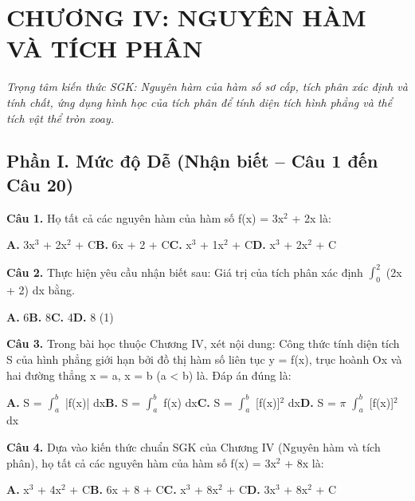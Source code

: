 \documentclass[11pt,a4paper]{article}
\begin{document}
\section*{\color{primary} CHƯƠNG IV: NGUYÊN HÀM VÀ TÍCH PHÂN}
\textit{Trọng tâm kiến thức SGK: Nguyên hàm của hàm số sơ cấp, tích phân xác định và tính chất, ứng dụng hình học của tích phân để tính diện tích hình phẳng và thể tích vật thể tròn xoay.}\par\vspace{4pt}
\subsection*{\color{accent} Phần I. Mức độ Dễ (Nhận biết -- Câu 1 đến Câu 20)}
\textbf{\color{primary} Câu 1.} Họ tất cả các nguyên hàm của hàm số f(x) = 3x$^2$ + 2x là:\par
\hspace*{1.5em}\textbf{A.} 3x$^3$ + 2x$^2$ + C\quad\quad \textbf{B.} 6x + 2 + C\quad\quad \textbf{C.} x$^3$ + 1x$^2$ + C\quad\quad \textbf{D.} x$^3$ + 2x$^2$ + C\par\vspace{2pt}
\textbf{\color{primary} Câu 2.} Thực hiện yêu cầu nhận biết sau: Giá trị của tích phân xác định $\int_{0}^{2}$ (2x + 2) dx bằng.\par
\hspace*{1.5em}\textbf{A.} 6\quad\quad \textbf{B.} 8\quad\quad \textbf{C.} 4\quad\quad \textbf{D.} 8 (1)\par\vspace{2pt}
\textbf{\color{primary} Câu 3.} Trong bài học thuộc Chương IV, xét nội dung: Công thức tính diện tích S của hình phẳng giới hạn bởi đồ thị hàm số liên tục y = f(x), trục hoành Ox và hai đường thẳng x = a, x = b (a < b) là. Đáp án đúng là:\par
\hspace*{1.5em}\textbf{A.} S = $\int_{a}^{b}$ |f(x)| dx\quad\quad \textbf{B.} S = $\int_{a}^{b}$ f(x) dx\quad\quad \textbf{C.} S = $\int_{a}^{b}$ [f(x)]$^2$ dx\quad\quad \textbf{D.} S = $\pi$ $\int_{a}^{b}$ [f(x)]$^2$ dx\par\vspace{2pt}
\textbf{\color{primary} Câu 4.} Dựa vào kiến thức chuẩn SGK của Chương IV (Nguyên hàm và tích phân), họ tất cả các nguyên hàm của hàm số f(x) = 3x$^2$ + 8x là:\par
\hspace*{1.5em}\textbf{A.} x$^3$ + 4x$^2$ + C\quad\quad \textbf{B.} 6x + 8 + C\quad\quad \textbf{C.} x$^3$ + 8x$^2$ + C\quad\quad \textbf{D.} 3x$^3$ + 8x$^2$ + C\par\vspace{2pt}
\end{document}
